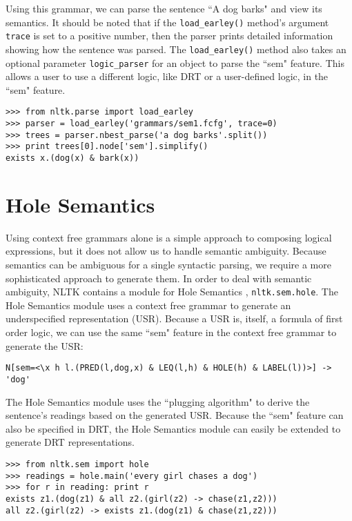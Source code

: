 \documentclass[11pt]{article}
\newcommand{\dhgcode}[1]{{\tt #1}}
\begin{document}
Using this grammar, we can parse the sentence ``A dog barks" and view its semantics.  It should be noted that if the \dhgcode{load\_earley()} method's argument \dhgcode{trace} is set to a positive number, then the parser prints detailed information showing how the sentence was parsed.  The \dhgcode{load\_earley()} method also takes an optional parameter \dhgcode{logic\_parser} for an object to parse the ``sem" feature.  This allows a user to use a different logic, like DRT or a user-defined logic, in the ``sem" feature.

\begin{verbatim}
>>> from nltk.parse import load_earley
>>> parser = load_earley('grammars/sem1.fcfg', trace=0)
>>> trees = parser.nbest_parse('a dog barks'.split())
>>> print trees[0].node['sem'].simplify()
exists x.(dog(x) & bark(x))
\end{verbatim}


\section{Hole Semantics}
Using context free grammars alone is a simple approach to composing logical expressions, but it does not allow us to handle semantic ambiguity.  Because semantics can be ambiguous for a single syntactic parsing, we require a more sophisticated approach to generate them.  In order to deal with semantic ambiguity, NLTK contains a module for Hole Semantics \cite{BB}, \dhgcode{nltk.sem.hole}.  The Hole Semantics module uses a context free grammar to generate an underspecified representation (USR).  Because a USR is, itself, a formula of first order logic, we can use the same ``sem" feature in the context free grammar to generate the USR:

\small
\begin{verbatim}
N[sem=<\x h l.(PRED(l,dog,x) & LEQ(l,h) & HOLE(h) & LABEL(l))>] -> 'dog'
\end{verbatim}
\normalsize

The Hole Semantics module uses the ``plugging algorithm" to derive the sentence's readings based on the generated USR.  Because the ``sem" feature can also be specified in DRT, the Hole Semantics module can easily be extended to generate DRT representations.

\begin{verbatim}
>>> from nltk.sem import hole
>>> readings = hole.main('every girl chases a dog')
>>> for r in reading: print r
exists z1.(dog(z1) & all z2.(girl(z2) -> chase(z1,z2)))
all z2.(girl(z2) -> exists z1.(dog(z1) & chase(z1,z2)))
\end{verbatim}
\end{document}
